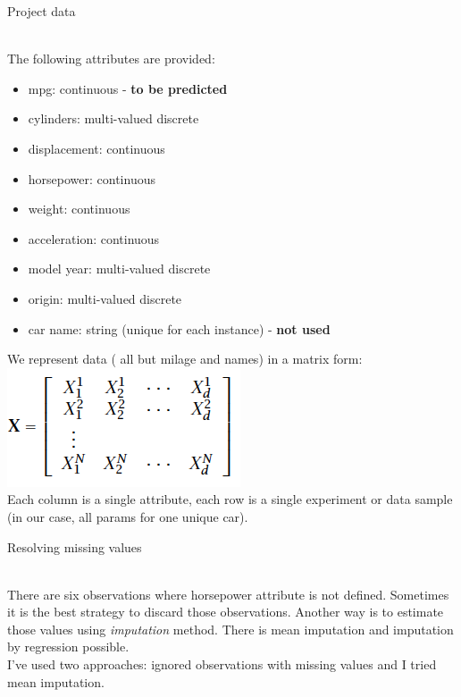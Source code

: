 \documentclass[12pt, letterpaper]{article}
\begin{document}
\begin{enumerate}[label=\Roman*.]
	
	{\bf \item Project data} \\
	
	The following attributes are provided:
	\begin{itemize}
		\item    mpg:           continuous  -  {\bf to be predicted}
		\item    cylinders:     multi-valued discrete
		\item    displacement:  continuous
		\item    horsepower:    continuous
		\item    weight:        continuous
		\item    acceleration:  continuous
		\item    model year:    multi-valued discrete
		\item    origin:        multi-valued discrete
		\item    car name:      string (unique for each instance) - {\bf not used}
	\end{itemize}
	
	We represent data ( all but milage and names) in a matrix form:\\
	\includegraphics[scale=0.5]{pics/matrix.png} \\
	
	Each column is a single attribute, each row is a single experiment or data sample (in our case, all params for one unique car).
	
	{\bf \item Resolving missing values} \\
	
	There are six observations where horsepower attribute is not defined. Sometimes it is the best strategy to discard those observations. Another way is  to estimate those values using {\it imputation} method. There is mean imputation and imputation by regression possible. \\
	I've used two approaches: ignored observations with missing values and I tried mean imputation. 
	

\end{enumerate}
\end{document}
